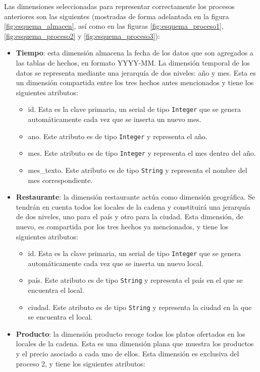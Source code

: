 \documentclass[12pt]{opticajnl}
\begin{document}
Las dimensiones seleccionadas para representar correctamente los procesos anteriores son las siguientes (mostradas de forma adelantada en la figura \ref{fig:esquema_almacen}, así como en las figuras \ref{fig:esquema_proceso1}, \ref{fig:esquema_proceso2} y \ref{fig:esquema_proceso3}):
\begin{itemize}
\item \textbf{Tiempo}: esta dimensión almacena la fecha de los datos que son agregados a las tablas de hechos, en formato YYYY-MM. La dimensión temporal de los datos se representa mediante una jerarquía de dos niveles: año y mes. Esta es un dimensión compartida entre los tres hechos antes mencionados y tiene los siguientes atributos:
\begin{itemize}
\item id. Esta es la clave primaria, un serial de tipo \texttt{Integer} que se genera automáticamente cada vez que se inserta un nuevo mes.
\item ano. Este atributo es de tipo \texttt{Integer} y representa el año.
\item mes. Este atributo es de tipo \texttt{Integer} y representa el mes dentro del año.
\item mes\_texto. Este atributo es de tipo \texttt{String} y representa el nombre del mes correspondiente.
\end{itemize}
\item \textbf{Restaurante}: la dimensión restaurante actúa como dimensión geográfica. Se tendrán en cuenta todos los locales de la cadena y constituirá una jerarquía de dos niveles, uno para el país y otro para la ciudad. Esta dimensión, de nuevo, es compartida por los tres hechos ya mencionados, y tiene los siguientes atributos:
\begin{itemize}
\item id. Esta es la clave primaria, un serial de tipo \texttt{Integer} que se genera automáticamente cada vez que se inserta un nuevo local.
\item país. Este atributo es de tipo \texttt{String} y representa el país en el que se encuentra el local.
\item ciudad. Este atributo es de tipo \texttt{String} y representa la ciudad en la que se encuentra el local.
\end{itemize}
\item \textbf{Producto}: la dimensión producto recoge todos los platos ofertados en los locales de la cadena. Esta es una dimensión plana que muestra los productos y el precio asociado a cada uno de ellos. Esta dimensión es exclusiva del proceso 2, y tiene los siguientes atributos:

\end{itemize}
\end{document}
